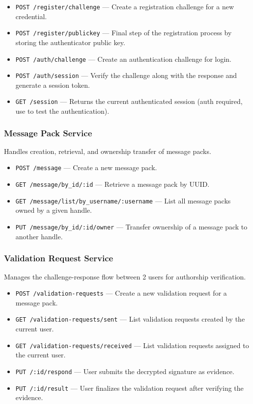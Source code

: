 \documentclass[letterpaper,11pt]{article}
\begin{document}
\begin{itemize}
    \item \texttt{POST /register/challenge} --- Create a registration challenge for a new credential.
    \item \texttt{POST /register/publickey} --- Final step of the registration process by storing the authenticator public key.
    \item \texttt{POST /auth/challenge} --- Create an authentication challenge for login.
    \item \texttt{POST /auth/session} --- Verify the challenge along with the response and generate a session token.
    \item \texttt{GET /session} --- Returns the current authenticated session (auth required, use to test the authentication).
\end{itemize}

\subsubsection*{Message Pack Service}
Handles creation, retrieval, and ownership transfer of message packs.

\begin{itemize}
    \item \texttt{POST /message} --- Create a new message pack.
    \item \texttt{GET /message/by\_id/:id} --- Retrieve a message pack by UUID.
    \item \texttt{GET /message/list/by\_username/:username} --- List all message packs owned by a given handle.
    \item \texttt{PUT /message/by\_id/:id/owner} --- Transfer ownership of a message pack to another handle.
\end{itemize}

\subsubsection*{Validation Request Service}
Manages the challenge-response flow between 2 users for authorship verification.

\begin{itemize}
    \item \texttt{POST /validation-requests} --- Create a new validation request for a message pack.
    \item \texttt{GET /validation-requests/sent} --- List validation requests created by the current user.
    \item \texttt{GET /validation-requests/received} --- List validation requests assigned to the current user.
    \item \texttt{PUT /:id/respond} --- User submits the decrypted signature as evidence.
    \item \texttt{PUT /:id/result} --- User finalizes the validation request after verifying the evidence.
\end{itemize}
\end{document}
